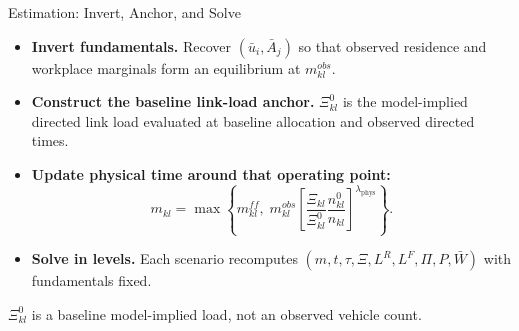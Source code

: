 \documentclass[11pt,aspectratio=169]{beamer}
\begin{document}
\begin{frame}{Estimation: Invert, Anchor, and Solve}
\begin{itemize}\small
  \item \textbf{Invert fundamentals.} Recover $(\bar u_i,\bar A_j)$ so that observed residence and workplace marginals form an equilibrium at $m_{kl}^{obs}$.
  \item \textbf{Construct the baseline link-load anchor.} $\Xi_{kl}^{0}$ is the model-implied directed link load evaluated at baseline allocation and observed directed times.
  \item \textbf{Update physical time around that operating point:}
  \vspace{-0.45em}\begin{equation}\label{eq:anchor}
    m_{kl}=\max\!\left\{
    m_{kl}^{ff},\;
    m_{kl}^{obs}
    \left[
    \frac{\Xi_{kl}}{\Xi_{kl}^{0}}
    \frac{n_{kl}^{0}}{n_{kl}}
    \right]^{\lambda_{\mathrm{phys}}}
    \right\}.
  \end{equation}
  \vspace{-0.65em}
  \item \textbf{Solve in levels.} Each scenario recomputes $(m,t,\tau,\Xi,L^R,L^F,\Pi,P,\bar W)$ with fundamentals fixed.
\end{itemize}
\vspace{-0.25em}
\begin{center}\footnotesize
$\Xi_{kl}^{0}$ is a baseline model-implied load, not an observed vehicle count.
\end{center}
\end{frame}
\end{document}

